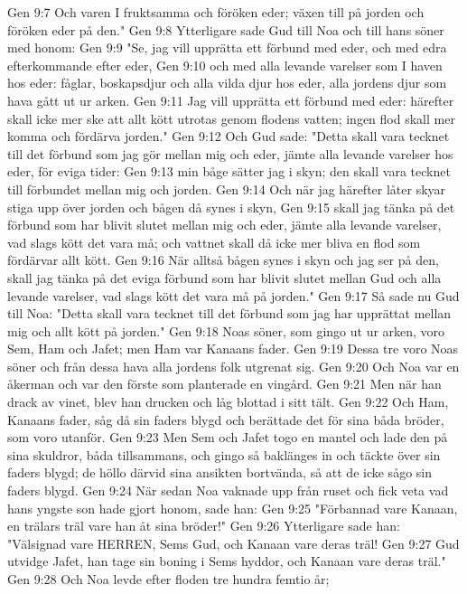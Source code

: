 Gen 9:7  Och varen I fruktsamma och föröken eder; växen till på jorden och föröken eder på den."
Gen 9:8  Ytterligare sade Gud till Noa och till hans söner med honom:
Gen 9:9  "Se, jag vill upprätta ett förbund med eder, och med edra efterkommande efter eder,
Gen 9:10  och med alla levande varelser som I haven hos eder: fåglar, boskapsdjur och alla vilda djur hos eder, alla jordens djur som hava gått ut ur arken.
Gen 9:11  Jag vill upprätta ett förbund med eder: härefter skall icke mer ske att allt kött utrotas genom flodens vatten; ingen flod skall mer komma och fördärva jorden."
Gen 9:12  Och Gud sade: "Detta skall vara tecknet till det förbund som jag gör mellan mig och eder, jämte alla levande varelser hos eder, för eviga tider:
Gen 9:13  min båge sätter jag i skyn; den skall vara tecknet till förbundet mellan mig och jorden.
Gen 9:14  Och när jag härefter låter skyar stiga upp över jorden och bågen då synes i skyn,
Gen 9:15  skall jag tänka på det förbund som har blivit slutet mellan mig och eder, jämte alla levande varelser, vad slags kött det vara må; och vattnet skall då icke mer bliva en flod som fördärvar allt kött.
Gen 9:16  När alltså bågen synes i skyn och jag ser på den, skall jag tänka på det eviga förbund som har blivit slutet mellan Gud och alla levande varelser, vad slags kött det vara må på jorden."
Gen 9:17  Så sade nu Gud till Noa: "Detta skall vara tecknet till det förbund som jag har upprättat mellan mig och allt kött på jorden."
Gen 9:18  Noas söner, som gingo ut ur arken, voro Sem, Ham och Jafet; men Ham var Kanaans fader.
Gen 9:19  Dessa tre voro Noas söner och från dessa hava alla jordens folk utgrenat sig.
Gen 9:20  Och Noa var en åkerman och var den förste som planterade en vingård.
Gen 9:21  Men när han drack av vinet, blev han drucken och låg blottad i sitt tält.
Gen 9:22  Och Ham, Kanaans fader, såg då sin faders blygd och berättade det för sina båda bröder, som voro utanför.
Gen 9:23  Men Sem och Jafet togo en mantel och lade den på sina skuldror, båda tillsammans, och gingo så baklänges in och täckte över sin faders blygd; de höllo därvid sina ansikten bortvända, så att de icke sågo sin faders blygd.
Gen 9:24  När sedan Noa vaknade upp från ruset och fick veta vad hans yngste son hade gjort honom, sade han:
Gen 9:25  "Förbannad vare Kanaan, en trälars träl vare han åt sina bröder!"
Gen 9:26  Ytterligare sade han: "Välsignad vare HERREN, Sems Gud, och Kanaan vare deras träl!
Gen 9:27  Gud utvidge Jafet, han tage sin boning i Sems hyddor, och Kanaan vare deras träl."
Gen 9:28  Och Noa levde efter floden tre hundra femtio år;
